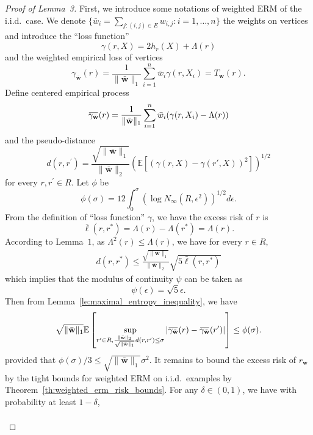 \documentclass[letterpaper]{article} %
\def\DoubleColumn{}
\newcommand{\E}{\mathbb{E}}
\newcommand{\overbar}[1]{\mkern 1.5mu\overline{\mkern-1.5mu#1\mkern-1.5mu}\mkern 1.5mu}
\newcommand*\cen[1]{\overbar{#1}}
\newcommand{\weight}{\mathbf{w}}
\newcommand{\verticeweight}{\bar{\mathbf{w}}}
\newcommand{\relossf}{\bar{\ell}}
\newcommand{\cenprocess}[1]{\cen{\gamma_{#1}}}
\newcommand{\pair}[1]{(#1)}
\newcommand{\normo}[1]{\|#1\|_1}
\begin{document}
\begin{proof}[Proof of Lemma~3] %
    First, we introduce some notations of weighted ERM of the i.i.d.\ case. 
    We denote $\{\bar{w}_i=\sum_{j:\pair{i,j}\in E}w_{i,j}: i=1,\dots,n\}$ the weights on vertices and introduce the ``loss function''
    \[\gamma(r, X)=2h_r(X)+\Lambda{}(r)\]
    and the weighted empirical loss of vertices
    \[\gamma_\verticeweight{}(r)=\frac{1}{\normo{\verticeweight{}}}\sum_{i=1}^n\bar{w}_i\gamma(r,X_i)=T_\weight{}(r).\]
    Define centered empirical process
    \[\cenprocess{\verticeweight}(r)=\frac{1}{\normo{\verticeweight{}}}\sum_{i=1}^n\bar{w}_i(\gamma(r,X_i)-\Lambda(r))\]
    and the pseudo-distance
    \[d(r,r^\prime) = \frac{\sqrt{\normo{\verticeweight{}}}}{\|\verticeweight\|_2}\left(\E[(\gamma(r,X)-\gamma(r',X))^2]\right)^{1/2}\]
    for every $r,r^\prime\in R$.
    Let $\phi$ be
    \begin{equation}
        \label{eq:proof_phi}
        \phi(\sigma)=12\int_0^{\sigma}(\log N_\infty(R,\epsilon^2))^{1/2}d\epsilon.
    \end{equation}
    From the definition of ``loss function'' $\gamma$, we have the excess risk of $r$ is
    \[\relossf(r,r^*)=\Lambda(r)-\Lambda(r^*)=\Lambda(r).\]
    According to Lemma~$1$, as $\Lambda^2(r)\le \Lambda(r)$, we have for every $r\in R$,
    \begin{align*}
        d(r,r^*)\le \frac{\sqrt{\normo{\verticeweight{}}}}{\|\verticeweight\|_2}\sqrt{5\relossf(r,r^*)}
    \end{align*}
    which implies that the modulus of continuity $\psi$ can be taken as
    \begin{equation}
        \label{eq:proof_psi}
        \psi(\epsilon)=\sqrt{5}\epsilon.
    \end{equation}
    Then from Lemma~\ref{le:maximal_entropy_inequality}, we have
    \[\sqrt{\normo{\verticeweight{}}}\E\left[\sup_{r^\prime\in R,\frac{\|\verticeweight\|_2}{\sqrt{\normo{\verticeweight{}}}}d(r,r^\prime)\le \sigma}|\cenprocess{\verticeweight}(r)-\cenprocess{\verticeweight}(r^\prime)|\right]\le \phi(\sigma).\]
    provided that $\phi(\sigma)/3\le \sqrt{\normo{\verticeweight{}}}\sigma^2$.
    It remains to bound the excess risk of $r_\weight{}$ by the tight bounds for weighted ERM on i.i.d.\ examples by Theorem~\ref{th:weighted_erm_risk_bounds}. For any $\delta\in(0,1)$, we have with probability at least $1-\delta$,
    \DoubleColumn
    \begin{equation}
        \begin{aligned}
            \label{eq:main_result_proof_1}

\end{aligned}
\end{equation}
\end{proof}
\end{document}

